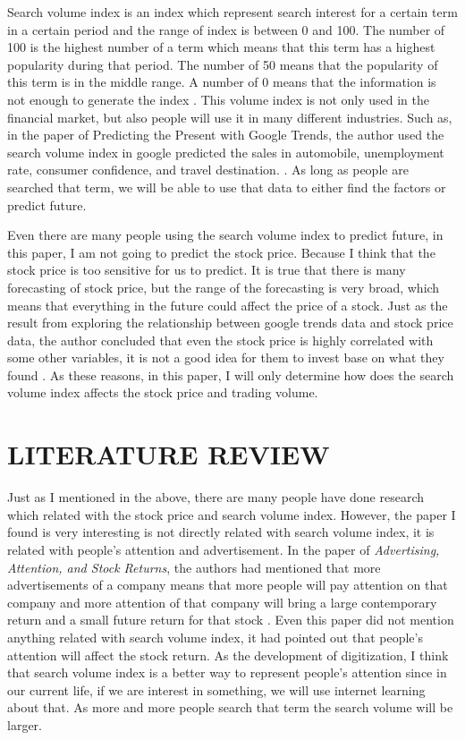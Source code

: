 \documentclass[12pt,english]{article}
\begin{document}
Search volume index is an index which represent search interest for a certain term in a certain period and the range of index is between 0 and 100. The number of 100 is the highest number of a term which means that this term has a highest popularity during that period. The number of  50 means that the popularity of this term is in the middle range. A number of 0 means that the information is not enough to generate the index \citep{engelberg2011search}. This volume index is not only used in the financial market, but also people will use it in many different industries. Such as, in the paper of Predicting the Present with Google Trends, the author used the search volume index in google predicted the sales in automobile, unemployment rate, consumer confidence, and travel destination. \citep{choi2012predicting}. As long as people are searched that term, we will be able to use that data to either find the factors or predict future.
\newline

\newline
Even there are many people using the search volume index to predict future, in this paper, I am not going to predict the stock price. Because I think that the stock price is too sensitive for us to predict. It is true that there is many forecasting of stock price, but the range of the forecasting is very broad, which means that everything in the future could affect the price of a stock. Just as the result from exploring the relationship between google trends data and stock price data, the author concluded that even the stock price is highly correlated with some other variables, it is not a good idea for them to invest base on what they found \citep{Dartanyon2017}. As these reasons, in this paper, I will only determine  how does the search volume index affects the stock price and trading volume. 
\section{LITERATURE REVIEW}
Just as I mentioned in the above, there are many people have done research which related with the stock price and search volume index. However, the paper I found is very interesting is not directly related with search volume index, it is related with people’s attention and advertisement. In the paper of \textit{Advertising, Attention, and Stock Returns}, the authors had mentioned that more advertisements of a company means that more people will pay attention on that company and more attention of that company will bring a large contemporary return and a small future return for that stock \citep{chemmanur2019advertising}. Even this paper did not mention anything related with search volume index, it had pointed out that people’s attention will affect the stock return. As the development of digitization, I think that search volume index is a better way to represent people’s attention since in our current life, if we are interest in something, we will use internet learning about that. As more and more people search that term the search volume will be larger.
\newline
\end{document}
